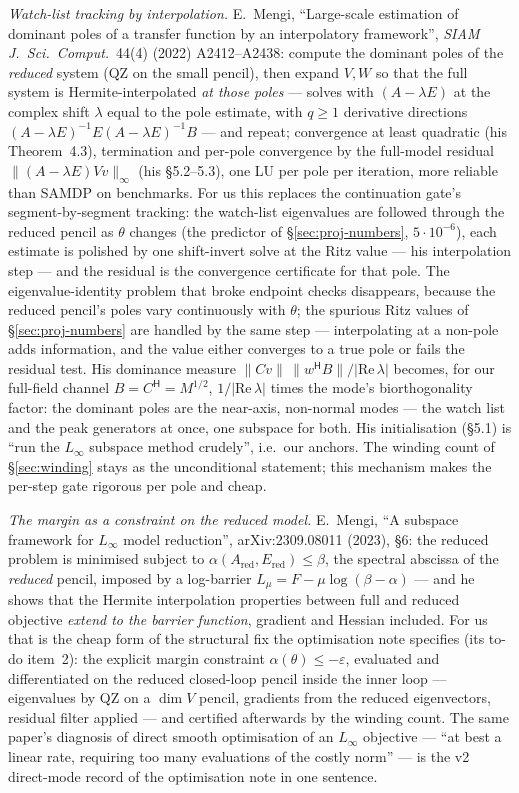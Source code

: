 \documentclass[11pt,a4paper]{article}
\newcommand{\eps}{\varepsilon}
\newcommand{\hp}{^{\mathsf H}}
\begin{document}
{{{\emph{Watch-list tracking by interpolation.}  E.~Mengi, ``Large-scale estimation of
dominant poles of a transfer function by an interpolatory framework'', \emph{SIAM J.\
Sci.\ Comput.}\ 44(4) (2022) A2412--A2438: compute the dominant poles of the
\emph{reduced} system (QZ on the small pencil), then expand $V,W$ so that the full
system is Hermite-interpolated \emph{at those poles} --- solves with $(A-\lambda E)$ at the
complex shift $\lambda$ equal to the pole estimate, with $q\ge1$ derivative directions
$(A-\lambda E)^{-1}E(A-\lambda E)^{-1}B$ --- and repeat; convergence at least quadratic
(his Theorem~4.3), termination and per-pole convergence by the full-model residual
$\|(A-\lambda E)Vv\|_\infty$ (his \S5.2--5.3), one LU per pole per iteration, more
reliable than SAMDP on benchmarks.  For us this replaces the continuation gate's
segment-by-segment tracking: the watch-list eigenvalues are followed through the reduced
pencil as $\theta$ changes (the predictor of \S\ref{sec:proj-numbers}, $5\cdot10^{-6}$),
each estimate is polished by one shift-invert solve at the Ritz value --- his
interpolation step --- and the residual is the convergence certificate for that pole.
The eigenvalue-identity problem that broke endpoint checks disappears, because the
reduced pencil's poles vary continuously with $\theta$; the spurious Ritz values of
\S\ref{sec:proj-numbers} are handled by the same step --- interpolating at a non-pole adds
information, and the value either converges to a true pole or fails the residual test.
His dominance measure $\|Cv\|\,\|w\hp B\|/|\mathrm{Re}\,\lambda|$ becomes, for our
full-field channel $B=C\hp=M^{1/2}$, $1/|\mathrm{Re}\,\lambda|$ times the mode's
biorthogonality factor: the dominant poles are the near-axis, non-normal modes --- the
watch list and the peak generators at once, one subspace for both.  His initialisation
(\S5.1) is ``run the $L_\infty$ subspace method crudely'', i.e.\ our anchors.  The winding
count of \S\ref{sec:winding} stays as the unconditional statement; this mechanism makes
the per-step gate rigorous per pole and cheap.

\emph{The margin as a constraint on the reduced model.}  E.~Mengi, ``A subspace framework
for $L_\infty$ model reduction'', arXiv:2309.08011 (2023), \S6: the reduced problem is
minimised subject to $\alpha(A_{\mathrm{red}},E_{\mathrm{red}})\le\beta$, the spectral
abscissa of the \emph{reduced} pencil, imposed by a log-barrier
$L_\mu=F-\mu\log(\beta-\alpha)$ --- and he shows that the Hermite interpolation
properties between full and reduced objective \emph{extend to the barrier function},
gradient and Hessian included.  For us that is the cheap form of the structural fix the
optimisation note specifies (its to-do item~2): the explicit margin constraint
$\alpha(\theta)\le-\eps$, evaluated and differentiated on the reduced closed-loop pencil
inside the inner loop --- eigenvalues by QZ on a $\dim V$ pencil, gradients from the
reduced eigenvectors, residual filter applied --- and certified afterwards by the
winding count.  The same paper's diagnosis of direct smooth optimisation of an $L_\infty$
objective --- ``at best a linear rate, requiring too many evaluations of the costly
norm'' --- is the v2 direct-mode record of the optimisation note in one sentence.}

}}
\end{document}

